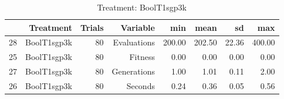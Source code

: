 \begin{table}[ht]
\centering
\begin{tabular}{rrrrrrrr}
  \hline
 & Treatment & Trials & Variable & min & mean & sd & max \\ 
  \hline
28 & BoolT1sgp3k &  80 & Evaluations & 200.00 & 202.50 & 22.36 & 400.00 \\ 
  25 & BoolT1sgp3k &  80 & Fitness & 0.00 & 0.00 & 0.00 & 0.00 \\ 
  27 & BoolT1sgp3k &  80 & Generations & 1.00 & 1.01 & 0.11 & 2.00 \\ 
  26 & BoolT1sgp3k &  80 & Seconds & 0.24 & 0.36 & 0.05 & 0.56 \\ 
   \hline
\end{tabular}
\caption{Treatment: BoolT1sgp3k} 
\end{table}
